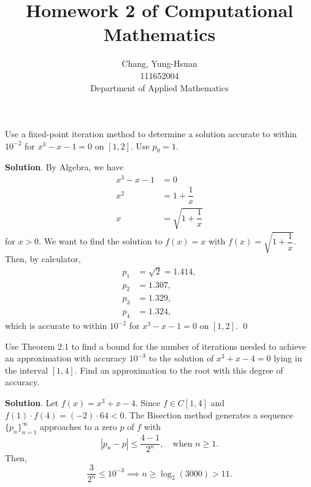 \documentclass[11pt]{article}
\title{Homework 2 of Computational Mathematics}
\author{Chang, Yung-Hsuan\\111652004\\Department of Applied Mathematics}
\theoremstyle{break}
\numberwithin{equation}{theorem}
\begin{document}
\maketitle
\thispagestyle{empty}
\newpage
{}

\begin{problem}\label{problem 1}
    Use a fixed-point iteration method to determine a solution accurate to within $10^{-2}$ for $x^3-x-1=0$ on $[1, 2]$. Use $p_0=1$.
\end{problem}
\textbf{Solution}. By Algebra, we have
\begin{align*}
    x^3-x-1&=0\\
    x^2&=1+\dfrac{1}{x}\\
    x&=\sqrt{1+\dfrac{1}{x}}
\end{align*}
for $x>0$. We want to find the solution to $f(x)=x$ with $f(x)=\sqrt{1+\dfrac{1}{x}}$. Then, by calculator,
\begin{align*}
    p_1&=\sqrt{2}=1.414,\\
    p_2&=1.307,\\
    p_3&=1.329,\\
    p_4&=1.324,
\end{align*}
which is accurate to within $10^{-2}$ for $x^3-x-1=0$ on $[1, 2]$. \qed


\newpage
\begin{problem}\label{problem 2}
    Use Theorem 2.1 to find a bound for the number of iterations needed to achieve an approximation with accuracy $10^{-3}$ to the solution of $x^3+x-4=0$ lying in the interval $[1, 4]$. Find an approximation to the root with this degree of accuracy.
\end{problem}
\textbf{Solution}. Let $f(x)=x^3+x-4$. Since $f\in C[1, 4]$ and $f(1)\cdot f(4)=(-2)\cdot 64<0$. The Bisection method generates a sequence $\{p_n\}_{n=1}^\infty$ approaches to a zero $p$ of $f$ with
\begin{equation*}
    |p_n-p|\leq\dfrac{4-1}{2^n},\quad\text{when $n\geq 1$}.
\end{equation*}
Then,
\begin{equation*}
    \dfrac{3}{2^n}\leq10^{-3}\implies n\geq\log_2(3000)>11.
\end{equation*}
\end{document}
